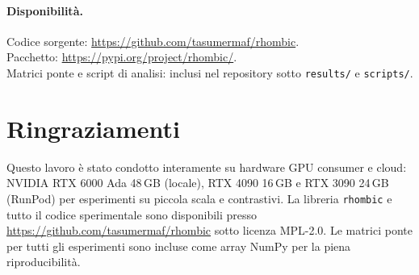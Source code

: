\documentclass[11pt]{article}
\begin{document}
\paragraph{Disponibilit\`a.}
Codice sorgente: \url{https://github.com/tasumermaf/rhombic}.\\
Pacchetto: \url{https://pypi.org/project/rhombic/}.\\
Matrici ponte e script di analisi: inclusi nel repository sotto
\texttt{results/} e \texttt{scripts/}.

\section*{Ringraziamenti}
Questo lavoro \`e stato condotto interamente su hardware GPU consumer e
cloud: NVIDIA RTX 6000 Ada 48\,GB (locale), RTX 4090 16\,GB e RTX 3090
24\,GB (RunPod) per esperimenti su piccola scala e contrastivi. La
libreria \texttt{rhombic} e tutto il codice sperimentale sono
disponibili presso \url{https://github.com/tasumermaf/rhombic} sotto
licenza MPL-2.0. Le matrici ponte per tutti gli esperimenti sono incluse
come array NumPy per la piena riproducibilit\`a.



\end{document}
